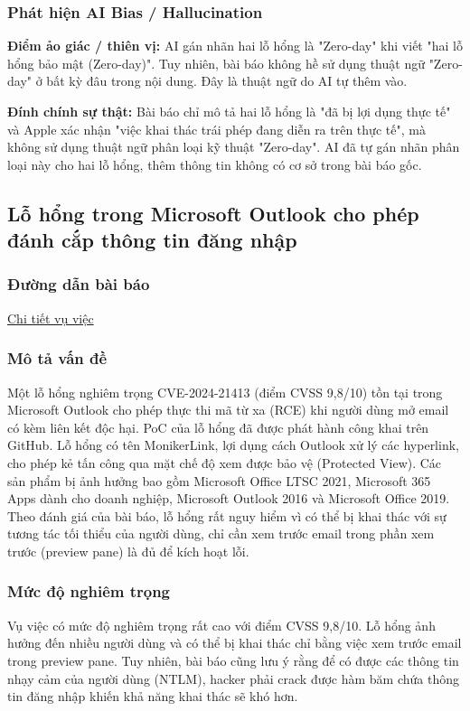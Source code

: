 \subsubsection{Phát hiện AI Bias / Hallucination}

\textbf{Điểm ảo giác / thiên vị:}
AI gán nhãn hai lỗ hổng là "Zero-day" khi viết "hai lỗ hổng bảo mật (Zero-day)". Tuy nhiên, bài báo không hề sử dụng thuật ngữ "Zero-day" ở bất kỳ đâu trong nội dung. Đây là thuật ngữ do AI tự thêm vào.

\textbf{Đính chính sự thật:}
Bài báo chỉ mô tả hai lỗ hổng là "đã bị lợi dụng thực tế" và Apple xác nhận "việc khai thác trái phép đang diễn ra trên thực tế", mà không sử dụng thuật ngữ phân loại kỹ thuật "Zero-day". AI đã tự gán nhãn phân loại này cho hai lỗ hổng, thêm thông tin không có cơ sở trong bài báo gốc.

\subsection{Lỗ hổng trong Microsoft Outlook cho phép đánh cắp thông tin đăng nhập}

\subsubsection{Đường dẫn bài báo}
\href{https://whitehat.vn/threads/canh-bao-lo-hong-trong-microsoft-outlook-cho-phep-danh-cap-thong-tin-dang-nhap.17844/}{Chi tiết vụ việc}

\subsubsection{Mô tả vấn đề}
Một lỗ hổng nghiêm trọng CVE-2024-21413 (điểm CVSS 9,8/10) tồn tại trong Microsoft Outlook cho phép thực thi mã từ xa (RCE) khi người dùng mở email có kèm liên kết độc hại. PoC của lỗ hổng đã được phát hành công khai trên GitHub. Lỗ hổng có tên MonikerLink, lợi dụng cách Outlook xử lý các hyperlink, cho phép kẻ tấn công qua mặt chế độ xem được bảo vệ (Protected View). Các sản phẩm bị ảnh hưởng bao gồm Microsoft Office LTSC 2021, Microsoft 365 Apps dành cho doanh nghiệp, Microsoft Outlook 2016 và Microsoft Office 2019. Theo đánh giá của bài báo, lỗ hổng rất nguy hiểm vì có thể bị khai thác với sự tương tác tối thiểu của người dùng, chỉ cần xem trước email trong phần xem trước (preview pane) là đủ để kích hoạt lỗi.

\subsubsection{Mức độ nghiêm trọng}
Vụ việc có mức độ nghiêm trọng rất cao với điểm CVSS 9,8/10. Lỗ hổng ảnh hưởng đến nhiều người dùng và có thể bị khai thác chỉ bằng việc xem trước email trong preview pane. Tuy nhiên, bài báo cũng lưu ý rằng để có được các thông tin nhạy cảm của người dùng (NTLM), hacker phải crack được hàm băm chứa thông tin đăng nhập khiến khả năng khai thác sẽ khó hơn.

